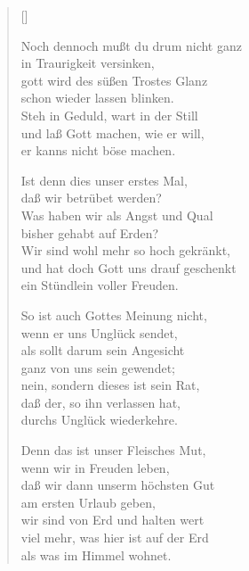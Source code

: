 \begin{multicols}{2}
\settowidth{\versewidth}{Noch dennoch mußt du drum nicht ganz}
\begin{verse}[\versewidth]

 Noch dennoch mußt du drum nicht ganz\\
in Traurigkeit versinken,\\
gott wird des süßen Trostes Glanz\\
schon wieder lassen blinken.\\
Steh in Geduld, wart in der Still\\
und laß Gott machen, wie er will,\\
er kanns nicht böse machen.

 Ist denn dies unser erstes Mal,\\
daß wir betrübet werden?\\
Was haben wir als Angst und Qual\\
bisher gehabt auf Erden?\\
Wir sind wohl mehr so hoch gekränkt,\\
und hat doch Gott uns drauf geschenkt\\
ein Stündlein voller Freuden.

 So ist auch Gottes Meinung nicht,\\
wenn er uns Unglück sendet,\\
als sollt darum sein Angesicht\\
ganz von uns sein gewendet;\\
nein, sondern dieses ist sein Rat,\\
daß der, so ihn verlassen hat,\\
durchs Unglück wiederkehre.

 Denn das ist unser Fleisches Mut,\\
wenn wir in Freuden leben,\\
daß wir dann unserm höchsten Gut\\
am ersten Urlaub geben,\\
wir sind von Erd und halten wert\\
viel mehr, was hier ist auf der Erd\\
als was im Himmel wohnet.


\end{verse}
\end{multicols}

